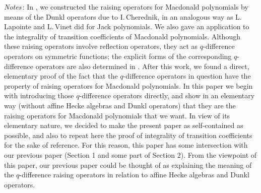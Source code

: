 {\eightpoint 
{\it Notes\,}: 
In \cite{KN}, we constructed the raising operators for Macdonald polynomials 
by means of the Dunkl operators due to I.\,Cherednik, in an analogous way 
as L.\,Lapointe and L.\,Vinet \cite{LV1, LV2} did for Jack polynomials.  
We also gave an application to the integrality of transition coefficients 
of Macdonald polynomials. 
Although these raising operators involve reflection operators, 
they act as $q$-difference operators on symmetric functions;
the explicit forms of the corresponding $q$-difference operators 
are also determined in \cite{KN}. 
After this work, we found a direct, elementary proof of the fact that
the $q$-difference operators in question have the property of raising 
operators for Macdonald polynomials. 
In this paper we begin with introducing those $q$-difference operators 
directly, and show in an elementary way (without affine Hecke algebras 
and Dunkl operators) that they are the raising operators for Macdonald 
polynomials that we want. 
In view of its elementary nature, we decided to make the present 
paper as self-contained as possible, and also to repeat here 
the proof of integrality of transition coefficients for the sake of 
reference. 
For this reason, this paper has some intersection with our previous paper 
\cite{KN} (Section 1 and some part of Section 2).  
{}From the viewpoint of this paper, our previous paper could be thought of 
as explaining the meaning of the $q$-difference raising operators 
in relation to affine Hecke algebras and Dunkl operators.  
}
\par\newpage
